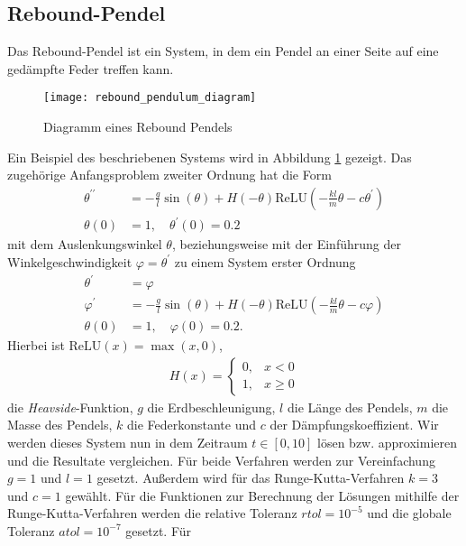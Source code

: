 \subsection{Rebound-Pendel}
\label{subsec:rebound-Pendel}
Das Rebound-Pendel ist ein System, in dem ein Pendel an einer Seite auf eine gedämpfte Feder treffen kann.
\begin{figure}
       \centering
       \texttt{[image: rebound\_pendulum\_diagram]}
       \caption{Diagramm eines Rebound Pendels\cite[6]{flamantSolvingDifferentialEquations2020}}
       \label{fig:rebound_pendulum_diagram}
\end{figure}
Ein Beispiel des beschriebenen Systems wird in Abbildung \ref{fig:rebound_pendulum_diagram} gezeigt. Das zugehörige
Anfangsproblem zweiter Ordnung hat die Form
\begin{align*}
       \theta^{\prime \prime} &= - \frac{g}{l} \sin(\theta) + H(-\theta)
       \text{ReLU}(-\frac{kl}{m}\theta - c \theta^{\prime})\\
       \theta(0) &= 1, \quad \theta^{\prime}(0)=0.2
\end{align*}
mit dem Auslenkungswinkel $\theta$,
beziehungsweise mit der Einführung der Winkelgeschwindigkeit $\varphi=\theta^{\prime}$ zu einem System erster Ordnung
\begin{align}
       \theta^{\prime} &= \varphi \nonumber \\
       \varphi^{\prime} &= - \frac{g}{l} \sin(\theta) + H(-\theta)
       \text{ReLU}(-\frac{kl}{m}\theta - c \varphi) \label{rebound-pendulum}\\
       \theta(0) &= 1, \quad \varphi(0)=0.2. \nonumber
\end{align}
Hierbei ist $\text{ReLU}(x)= \max(x, 0)$,
\begin{align*}
       H(x) =
       \begin{cases}
              0, &x<0 \\
              1, &x \geq 0
       \end{cases}
\end{align*}
die \textit{Heavside}-Funktion,
$g$ die Erdbeschleunigung, $l$ die Länge des Pendels, $m$ die Masse des Pendels, $k$ die Federkonstante und $c$ der
Dämpfungskoeffizient. Wir werden dieses System nun in dem Zeitraum $t \in [0, 10]$ lösen bzw. approximieren und die
Resultate vergleichen. Für beide Verfahren werden zur Vereinfachung $g=1$ und $l=1$ gesetzt. Außerdem wird für das
Runge-Kutta-Verfahren $k=3$ und $c=1$ gewählt. Für die Funktionen zur Berechnung der Lösungen mithilfe der
Runge-Kutta-Verfahren werden die relative Toleranz $rtol=10^{-5}$ und die globale Toleranz $atol=10^{-7}$ gesetzt. Für
